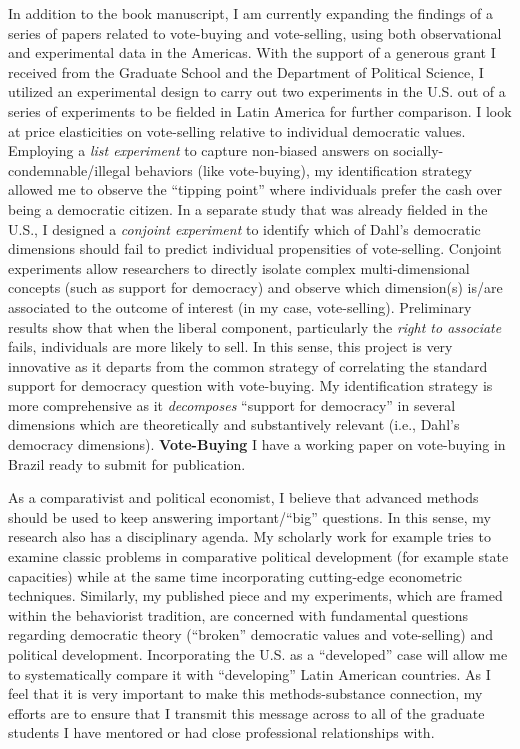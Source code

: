 \documentclass[10pt,stdletter,dateno,sigleft]{newlfm} %
\begin{document}
\begin{newlfm}
In addition to the book manuscript, I am currently expanding the findings of a series of papers related to vote-buying and vote-selling, using both observational and experimental data in the Americas. With the support of a generous grant I received from the Graduate School and the Department of Political Science, I utilized an experimental design to carry out two experiments in the U.S. out of a series of experiments to be fielded in Latin America for further comparison. I look at price elasticities on vote-selling relative to individual democratic values. Employing a \emph{list experiment} to capture non-biased answers on socially-condemnable/illegal behaviors (like vote-buying), my identification strategy allowed me to observe the ``tipping point'' where individuals prefer the cash over being a democratic citizen. In a separate study that was already fielded in the U.S., I designed a \emph{conjoint experiment} to identify which of Dahl's democratic dimensions should fail to predict individual propensities of vote-selling. Conjoint experiments allow researchers to directly isolate complex multi-dimensional concepts (such as support for democracy) and observe which dimension(s) is/are associated to the outcome of interest (in my case, vote-selling). Preliminary results show that when the liberal component, particularly the \emph{right to associate} fails, individuals are more likely to sell. In this sense, this project is very innovative as it departs from the common strategy of correlating the standard support for democracy question with vote-buying. My identification strategy is more comprehensive as it \emph{decomposes} ``support for democracy'' in several dimensions which are theoretically and substantively relevant (i.e., Dahl's democracy dimensions). 
{\bf Vote-Buying} I have a working paper on vote-buying in Brazil ready to submit for publication.

As a comparativist and political economist, I believe that advanced methods should be used to keep answering important/``big'' questions. In this sense, my research also has a disciplinary agenda. My scholarly work for example tries to examine classic problems in comparative political development (for example state capacities) while at the same time incorporating cutting-edge econometric techniques. Similarly, my published piece and my experiments, which are framed within the behaviorist tradition, are concerned with fundamental questions regarding democratic theory (``broken'' democratic values and vote-selling) and political development. Incorporating the U.S. as a ``developed'' case will allow me to systematically compare it with ``developing'' Latin American countries. As I feel that it is very important to make this methods-substance connection, my efforts are to ensure that I transmit this message across to all of the graduate students I have mentored or had close professional relationships with. 


\end{newlfm}
\end{document}
